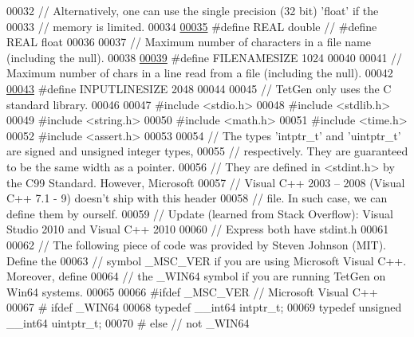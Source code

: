 \begin{DoxyCode}
00032 \textcolor{comment}{//   Alternatively, one can use the single precision (32 bit) 'float' if the}
00033 \textcolor{comment}{//   memory is limited.}
00034 
\hypertarget{tetgen_8h_source.tex_l00035}{}\hyperlink{tetgen_8h_a4b654506f18b8bfd61ad2a29a7e38c25}{00035} \textcolor{preprocessor}{#define REAL double  // #define REAL float}
00036 
00037 \textcolor{comment}{// Maximum number of characters in a file name (including the null).}
00038 
\hypertarget{tetgen_8h_source.tex_l00039}{}\hyperlink{tetgen_8h_a373ac5e350a5f9d149a7ff93a6188a47}{00039} \textcolor{preprocessor}{#define FILENAMESIZE 1024}
00040 
00041 \textcolor{comment}{// Maximum number of chars in a line read from a file (including the null).}
00042 
\hypertarget{tetgen_8h_source.tex_l00043}{}\hyperlink{tetgen_8h_a402e023bf75621df7eb202c28a8b59c5}{00043} \textcolor{preprocessor}{#define INPUTLINESIZE 2048}
00044 
00045 \textcolor{comment}{// TetGen only uses the C standard library.}
00046 
00047 \textcolor{preprocessor}{#include <stdio.h>}
00048 \textcolor{preprocessor}{#include <stdlib.h>}
00049 \textcolor{preprocessor}{#include <string.h>}
00050 \textcolor{preprocessor}{#include <math.h>}
00051 \textcolor{preprocessor}{#include <time.h>}
00052 \textcolor{preprocessor}{#include <assert.h>} 
00053 
00054 \textcolor{comment}{// The types 'intptr\_t' and 'uintptr\_t' are signed and unsigned integer types,}
00055 \textcolor{comment}{//   respectively. They are guaranteed to be the same width as a pointer.}
00056 \textcolor{comment}{//   They are defined in <stdint.h> by the C99 Standard. However, Microsoft }
00057 \textcolor{comment}{//   Visual C++ 2003 -- 2008 (Visual C++ 7.1 - 9) doesn't ship with this header}
00058 \textcolor{comment}{//   file. In such case, we can define them by ourself. }
00059 \textcolor{comment}{// Update (learned from Stack Overflow): Visual Studio 2010 and Visual C++ 2010}
00060 \textcolor{comment}{//   Express both have stdint.h}
00061 
00062 \textcolor{comment}{// The following piece of code was provided by Steven Johnson (MIT). Define the}
00063 \textcolor{comment}{//   symbol \_MSC\_VER if you are using Microsoft Visual C++. Moreover, define }
00064 \textcolor{comment}{//   the \_WIN64 symbol if you are running TetGen on Win64 systems.}
00065 
00066 \textcolor{preprocessor}{#ifdef \_MSC\_VER // Microsoft Visual C++}
00067 \textcolor{preprocessor}{#  ifdef \_WIN64}
00068      \textcolor{keyword}{typedef} \_\_int64 intptr\_t;
00069      \textcolor{keyword}{typedef} \textcolor{keywordtype}{unsigned} \_\_int64 uintptr\_t;
00070 \textcolor{preprocessor}{#  else // not \_WIN64}

\end{DoxyCode}
